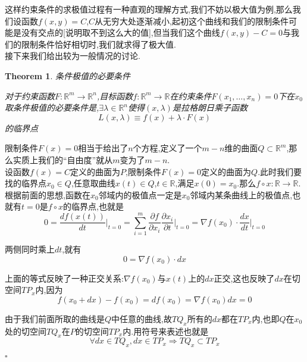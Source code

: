 \documentclass[11pt,hyperref,a4paper,UTF8]{ctexart}
\newtheorem{theorem}{Theorem}[subsection]
\newenvironment{cproof}{%
\heiti{证明}\kaishu
}{%
  \hfill $\square$
  \par\bigskip
}
\newcommand{\RR}{\mathbb{R}}
\begin{document}
\begin{CJK}{UTF8}{gkai}
这样约束条件的求极值过程有一种直观的理解方式,我们不妨以极大值为例,那么我们设函数$f(x,y) = C$,$C$从无穷大处逐渐减小,起初这个曲线和我们的限制条件可能是没有交点的[说明取不到这么大的值],但当我们这个曲线$f(x,y) - C = 0$与我们的限制条件恰好相切时,我们就求得了极大值.\\

接下来我们给出较为一般情况的讨论.

\begin{theorem}
  条件极值的必要条件

  对于约束函数$F: \RR^m \to \RR^n$,目标函数$f: \RR^m \to \RR$在约束条件$F(x_1,\ldots,x_n) = 0$下在$x_0$取条件极值的必要条件是,$\exists \lambda \in \RR^n$使得$(x,\lambda)$是拉格朗日乘子函数
  \[L(x,\lambda) \equiv f(x) + \lambda \cdot F(x)\]
  的临界点
\end{theorem}

\begin{cproof}
  
限制条件$F(x) = 0$相当于给出了$n$个方程,定义了一个$m - n$维的曲面$Q \subset \RR^m$,那么实质上我们的``自由度''就从$m$变为了$m - n$.\\

设函数$f(x) = C$定义的曲面为$P$,限制条件$F(x) = 0$定义的曲面为$Q$.此时我们要找的临界点$x_0 \in Q$,任意取曲线$x(t) \in Q$,$t \in \RR$,满足$x(0) = x_0$.那么$f \circ x : \RR \to \RR$.根据前面的思想,函数在$x_0$邻域内的极值点一定是$x_0$邻域内某条曲线上的极值点,也就有$t = 0$是$f\circ x$的临界点,也就是
\[0 = \frac{d f(x(t))}{dt}\bigg|_{t = 0}  = \sum_{i = 1}^{m}\frac{\partial f}{\partial x_i}\frac{\partial x_i}{\partial t}\bigg|_{t = 0}  = \nabla f(x_0) \cdot \frac{dx}{dt}\bigg|_{t = 0}\]



两侧同时乘上$dt$,就有
\[0 = \nabla f(x_0) \cdot dx\]


上面的等式反映了一种正交关系:$\nabla f(x_0)$与$x(t)$上的$dx$正交,这也反映了$dx$在切空间$TP_x$内,因为
\[f(x_0 + dx) - f(x_0) = df(x_0) = \nabla f(x_0) dx = 0\]

由于我们前面所取的曲线是$Q$中任意的曲线,故$TQ_x$所有的$dx$都在$TP_x$内,也即$Q$在$x_0$处的切空间$TQ_x$在$P$的切空间$TP_x$内.用符号来表述也就是
\[\forall dx \in TQ_x, dx \in T P_x \Rightarrow TQ_x \subset TP_x\]


\end{cproof}
\end{CJK}
\end{document}
